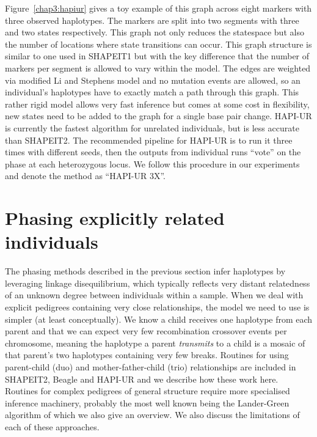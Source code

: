  Figure~\ref{chap3:hapiur} gives a toy example of this graph across eight markers with three observed haplotypes. The markers are split into two segments with three and two states respectively.  This graph not only reduces the statespace but also the number of locations where state transitions can occur.  This graph structure is similar to one used in SHAPEIT1 but with the key difference that the number of markers per segment is allowed to vary within the model. The edges are weighted via modified Li and Stephens model and no mutation events are allowed, so an individual's haplotypes have to exactly match a path through this graph.  This rather rigid model allows very fast inference but comes at some cost in flexibility, new states need to be added to the graph for a single base pair change.  HAPI-UR is currently the fastest algorithm for unrelated individuals, but is less accurate than SHAPEIT2.  The recommended pipeline for HAPI-UR is to run it three times with different seeds, then the outputs from individual runs ``vote'' on the phase at each heterozygous locus. We follow this procedure in our experiments and denote the method as ``HAPI-UR 3X''.
\clearpage
\section{Phasing explicitly related individuals}
The phasing methods described in the previous section infer haplotypes by leveraging linkage disequilibrium, which typically reflects very distant relatedness of an unknown degree between individuals within a sample.  When we deal with explicit pedigrees containing very close relationships, the model we need to use is simpler (at least conceptually). We know a child receives one haplotype from each parent and that we can expect very few recombination crossover events per chromosome, meaning the haplotype a parent \emph{transmits} to a child is a mosaic of that parent's two haplotypes containing very few breaks.  Routines for using parent-child (duo) and mother-father-child (trio) relationships are included in SHAPEIT2, Beagle and HAPI-UR and we describe how these work here.  Routines for complex pedigrees of general structure require more specialised inference machinery, probably the most well known being the Lander-Green algorithm of which we also give an overview.  We also discuss the limitations of each of these approaches.

